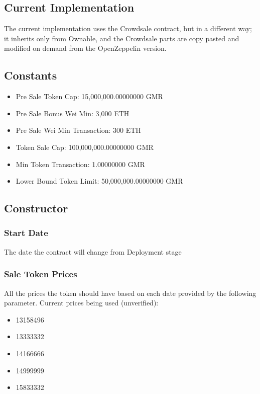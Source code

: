 \documentclass[11pt]{article} %
\begin{document}
\subsection{Current Implementation}
The current implementation uses the Crowdsale contract, but in a different way; it inherits only from Ownable, and the Crowdsale parts are copy pasted and modified on demand from the OpenZeppelin version.

\subsection{Constants}

\begin{itemize}
\item Pre Sale Token Cap: 15,000,000.00000000 GMR
\item Pre Sale Bonus Wei Min: 3,000 ETH
\item Pre Sale Wei Min Transaction: 300 ETH
\item Token Sale Cap: 100,000,000.00000000 GMR
\item Min Token Transaction: 1.00000000 GMR
\item Lower Bound Token Limit: 50,000,000.00000000 GMR
\end{itemize}

\subsection{Constructor}

\subsubsection{Start Date}
The date the contract will change from Deployment stage


\subsubsection{Sale Token Prices}
All the prices the token should have based on each date provided by the following parameter.
Current prices being used (unverified): 

\begin{itemize}
\item 13158496
\item 13333332
\item 14166666
\item 14999999
\item 15833332
\end{itemize}
\end{document}
